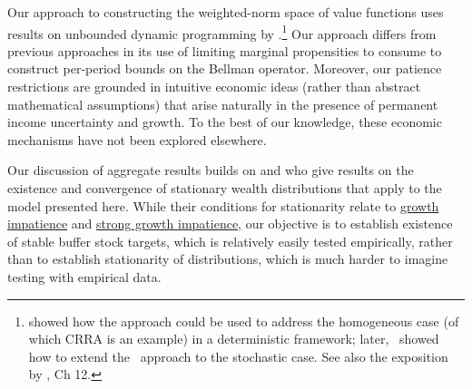 \documentclass[BufferStockTheory]{subfiles}
\begin{document}
Our approach to constructing the weighted-norm space of value functions uses results on unbounded dynamic programming by \citep{jboydWeighted}.\footnote{\cite{asHomogeneous} showed how the approach could be used to address the homogeneous case (of which CRRA is an example) in a deterministic framework; later,~\cite{duranDiscounting} showed how to extend the~\cite{jboydWeighted} approach to the stochastic case.
  See also the exposition by \cite{stachurski2022}, Ch 12.} Our approach differs from previous approaches in its use of limiting marginal propensities to consume to construct per-period bounds on the Bellman operator.
Moreover, our patience restrictions are grounded in intuitive economic ideas (rather than abstract mathematical assumptions) that arise naturally in the presence of permanent income uncertainty and growth.
To the best of our knowledge, these economic mechanisms have not been explored elsewhere.

Our discussion of aggregate results builds on \cite{szeidlInvariant} and \cite{harmenbergInvariant} who give results on the existence and convergence of stationary wealth distributions that apply to the model presented here.
While their conditions for stationarity relate to \hyperlink{GICRaw}{growth impatience} and \hyperlink{GICMod}{strong growth impatience,} our objective is to establish existence of stable buffer stock targets, which is relatively easily tested empirically, rather than to establish stationarity of distributions, which is much harder to imagine testing with empirical data.


\ifSubfilesClassLoaded{ 
    
  }{}
\end{document}
